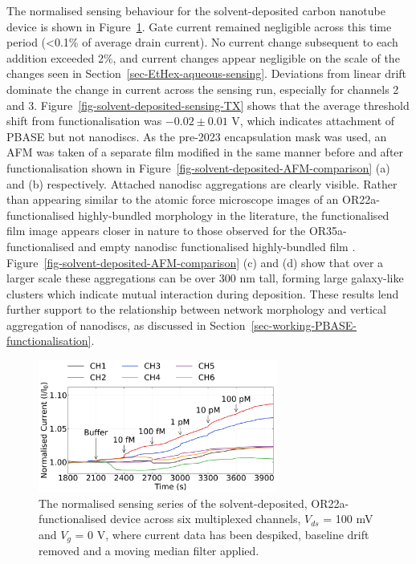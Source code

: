 \documentclass[
  a4paper,
]{scrbook}
\begin{document}
The normalised sensing behaviour for the solvent-deposited carbon
nanotube device is shown in Figure~\ref{fig-solvent-deposited-sensing}.
Gate current remained negligible across this time period (\textless0.1\%
of average drain current). No current change subsequent to each addition
exceeded 2\%, and current changes appear negligible on the scale of the
changes seen in Section~\ref{sec-EtHex-aqueous-sensing}. Deviations from
linear drift dominate the change in current across the sensing run,
especially for channels 2 and 3.
Figure~\ref{fig-solvent-deposited-sensing-TX} shows that the average
threshold shift from functionalisation was \(-0.02 \pm 0.01\) V, which
indicates attachment of PBASE but not nanodiscs. As the pre-2023
encapsulation mask was used, an AFM was taken of a separate film
modified in the same manner before and after functionalisation shown in
Figure~\ref{fig-solvent-deposited-AFM-comparison} (a) and (b)
respectively. Attached nanodisc aggregations are clearly visible. Rather
than appearing similar to the atomic force microscope images of an
OR22a-functionalised highly-bundled morphology in the literature, the
functionalised film image appears closer in nature to those observed for
the OR35a-functionalised and empty nanodisc functionalised
highly-bundled film \autocite{Murugathas2019a}.
Figure~\ref{fig-solvent-deposited-AFM-comparison} (c) and (d) show that
over a larger scale these aggregations can be over 300 nm tall, forming
large galaxy-like clusters which indicate mutual interaction during
deposition. These results lend further support to the relationship
between network morphology and vertical aggregation of nanodiscs, as
discussed in Section~\ref{sec-working-PBASE-functionalisation}.

\begin{figure}

{\centering \includegraphics[width=0.7\textwidth,height=\textheight]{figures/ch7/NTQ25C5_OR22a_sample_220126_filtered_detrend_trunc_arrows_normalised.png}

}

\caption{\label{fig-solvent-deposited-sensing}The normalised sensing
series of the solvent-deposited, OR22a-functionalised device across six
multiplexed channels, \(V_{ds}\) = 100 mV and \(V_g\) = 0 V, where
current data has been despiked, baseline drift removed and a moving
median filter applied.}

\end{figure}
\end{document}
